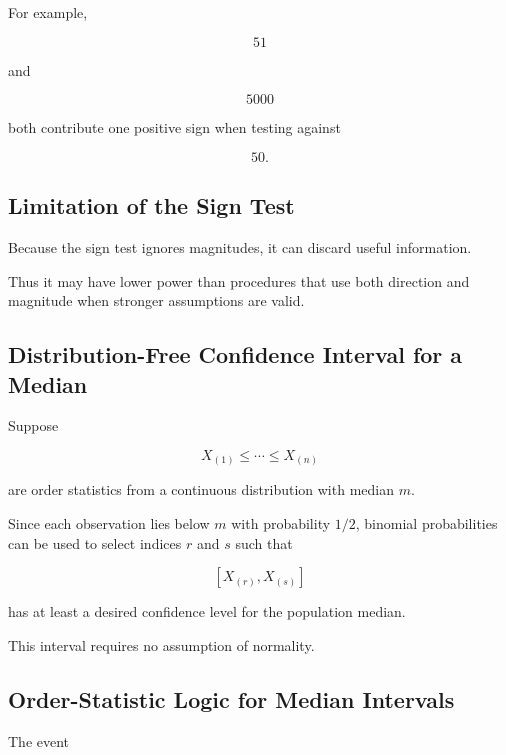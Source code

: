 For example,

\[
51
\]

and

\[
5000
\]

both contribute one positive sign when testing against

\[
50.
\]

\subsection{Limitation of the Sign Test}
\label{subsec:sign-test-limitation}

Because the sign test ignores magnitudes, it can discard useful
information.

Thus it may have lower power than procedures that use both direction and
magnitude when stronger assumptions are valid.

\subsection{Distribution-Free Confidence Interval for a Median}
\label{subsec:distribution-free-median-ci}

Suppose

\[
X_{(1)}
\leq
\cdots
\leq
X_{(n)}
\]

are order statistics from a continuous distribution with median \(m\).

Since each observation lies below \(m\) with probability \(1/2\), binomial
probabilities can be used to select indices \(r\) and \(s\) such that

\[
\boxed{
[X_{(r)},X_{(s)}]
}
\]

has at least a desired confidence level for the population median.

This interval requires no assumption of normality.

\subsection{Order-Statistic Logic for Median Intervals}
\label{subsec:median-order-statistic-logic}

The event

